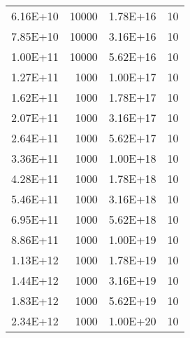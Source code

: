 \begin{table}
\begin{center}
\begin{tabular}{l r | l r }
		6.16E+10    & 10000   & 1.78E+16    & 10      \\
		7.85E+10    & 10000   & 3.16E+16    & 10      \\
		1.00E+11    & 10000   & 5.62E+16    & 10      \\
		1.27E+11    & 1000    & 1.00E+17    & 10      \\
		1.62E+11    & 1000    & 1.78E+17    & 10      \\
		2.07E+11    & 1000    & 3.16E+17    & 10      \\
		2.64E+11    & 1000    & 5.62E+17    & 10      \\
		3.36E+11    & 1000    & 1.00E+18    & 10      \\
		4.28E+11    & 1000    & 1.78E+18    & 10      \\ 
		5.46E+11    & 1000    & 3.16E+18    & 10      \\
		6.95E+11    & 1000    & 5.62E+18    & 10      \\
		8.86E+11    & 1000    & 1.00E+19    & 10      \\
		1.13E+12    & 1000    & 1.78E+19    & 10      \\
		1.44E+12    & 1000    & 3.16E+19    & 10      \\
		1.83E+12    & 1000    & 5.62E+19    & 10      \\
		2.34E+12    & 1000    & 1.00E+20    & 10      \\ 
		\hline
	\end{tabular}
	\end{center}
\end{table}


